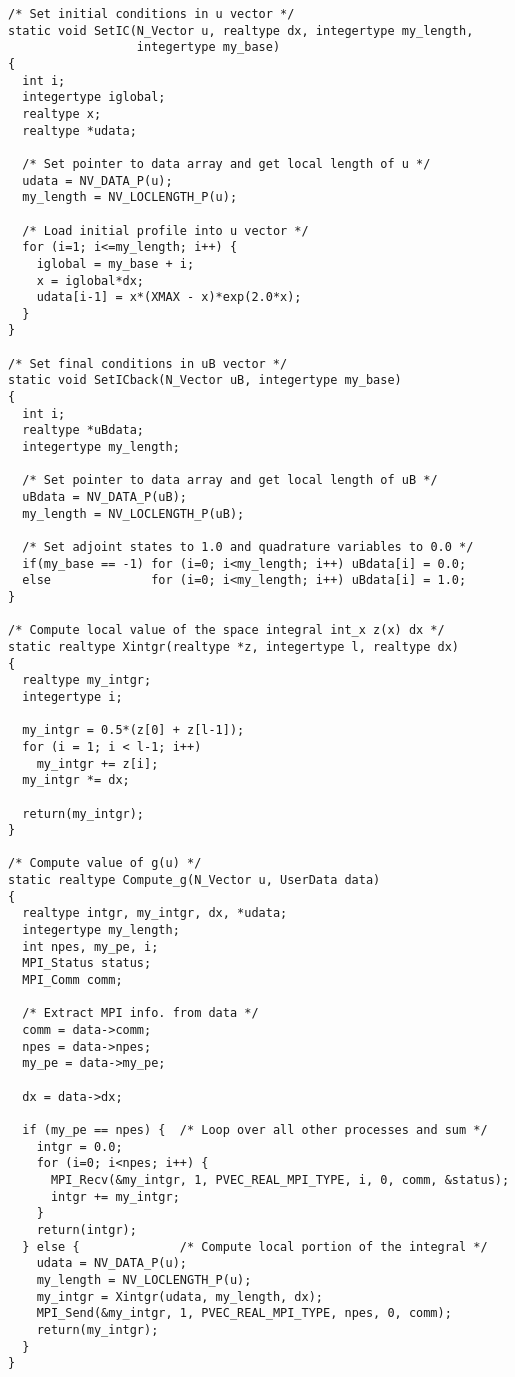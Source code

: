 \begin{verbatim}
/* Set initial conditions in u vector */
static void SetIC(N_Vector u, realtype dx, integertype my_length,  
                  integertype my_base)
{
  int i;
  integertype iglobal;
  realtype x;
  realtype *udata;

  /* Set pointer to data array and get local length of u */
  udata = NV_DATA_P(u);
  my_length = NV_LOCLENGTH_P(u);

  /* Load initial profile into u vector */
  for (i=1; i<=my_length; i++) {
    iglobal = my_base + i;
    x = iglobal*dx;
    udata[i-1] = x*(XMAX - x)*exp(2.0*x);
  }  
}

/* Set final conditions in uB vector */
static void SetICback(N_Vector uB, integertype my_base)
{
  int i;
  realtype *uBdata;
  integertype my_length;

  /* Set pointer to data array and get local length of uB */
  uBdata = NV_DATA_P(uB);
  my_length = NV_LOCLENGTH_P(uB);

  /* Set adjoint states to 1.0 and quadrature variables to 0.0 */
  if(my_base == -1) for (i=0; i<my_length; i++) uBdata[i] = 0.0;
  else              for (i=0; i<my_length; i++) uBdata[i] = 1.0;
}

/* Compute local value of the space integral int_x z(x) dx */
static realtype Xintgr(realtype *z, integertype l, realtype dx)
{
  realtype my_intgr;
  integertype i;

  my_intgr = 0.5*(z[0] + z[l-1]);
  for (i = 1; i < l-1; i++)
    my_intgr += z[i]; 
  my_intgr *= dx;

  return(my_intgr);
}

/* Compute value of g(u) */
static realtype Compute_g(N_Vector u, UserData data)
{
  realtype intgr, my_intgr, dx, *udata;
  integertype my_length;
  int npes, my_pe, i;
  MPI_Status status;
  MPI_Comm comm;

  /* Extract MPI info. from data */
  comm = data->comm;
  npes = data->npes;
  my_pe = data->my_pe;

  dx = data->dx;

  if (my_pe == npes) {  /* Loop over all other processes and sum */
    intgr = 0.0;
    for (i=0; i<npes; i++) {
      MPI_Recv(&my_intgr, 1, PVEC_REAL_MPI_TYPE, i, 0, comm, &status); 
      intgr += my_intgr;
    }
    return(intgr);
  } else {              /* Compute local portion of the integral */
    udata = NV_DATA_P(u);
    my_length = NV_LOCLENGTH_P(u);
    my_intgr = Xintgr(udata, my_length, dx);
    MPI_Send(&my_intgr, 1, PVEC_REAL_MPI_TYPE, npes, 0, comm);
    return(my_intgr);
  }
}


\end{verbatim}
